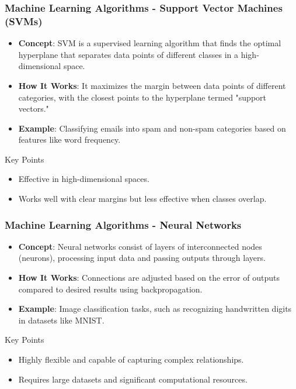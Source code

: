 \documentclass[aspectratio=169]{beamer}
\begin{document}
\begin{frame}[fragile]
    \frametitle{Machine Learning Algorithms - Support Vector Machines (SVMs)}
    \begin{itemize}
        \item \textbf{Concept}: SVM is a supervised learning algorithm that finds the optimal hyperplane that separates data points of different classes in a high-dimensional space.
        \item \textbf{How It Works}: It maximizes the margin between data points of different categories, with the closest points to the hyperplane termed "support vectors."
        \item \textbf{Example}: Classifying emails into spam and non-spam categories based on features like word frequency.
    \end{itemize}
    
    \begin{block}{Key Points}
        \begin{itemize}
            \item Effective in high-dimensional spaces.
            \item Works well with clear margins but less effective when classes overlap.
        \end{itemize}
    \end{block}
\end{frame}

\begin{frame}[fragile]
    \frametitle{Machine Learning Algorithms - Neural Networks}
    \begin{itemize}
        \item \textbf{Concept}: Neural networks consist of layers of interconnected nodes (neurons), processing input data and passing outputs through layers.
        \item \textbf{How It Works}: Connections are adjusted based on the error of outputs compared to desired results using backpropagation.
        \item \textbf{Example}: Image classification tasks, such as recognizing handwritten digits in datasets like MNIST.
    \end{itemize}
    
    \begin{block}{Key Points}
        \begin{itemize}
            \item Highly flexible and capable of capturing complex relationships.
            \item Requires large datasets and significant computational resources.
        \end{itemize}
    \end{block}
\end{frame}
\end{document}

